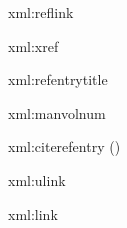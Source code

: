 
\startxmlsetups xml:reflink
\stopxmlsetups

\startxmlsetups xml:xref
\stopxmlsetups

\startxmlsetups xml:refentrytitle
\stopxmlsetups

\startxmlsetups xml:manvolnum
\stopxmlsetups

\startxmlsetups xml:citerefentry
	()
\stopxmlsetups

\startxmlsetups xml:ulink
\stopxmlsetups

\startxmlsetups xml:link
\stopxmlsetups

